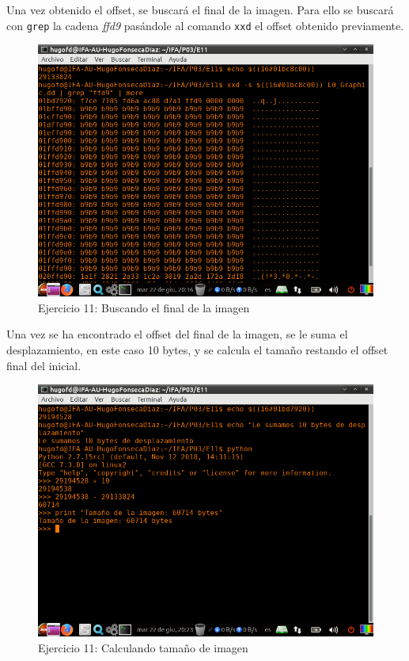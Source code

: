 \documentclass[11pt]{article}
\begin{document}
Una vez obtenido el offset, se buscará el final de la imagen. Para ello se buscará con \verb|grep| la cadena \textit{ffd9} pasándole al comando \verb|xxd| el offset obtenido previamente.

\begin{figure}[H]
    \caption{Ejercicio 11: Buscando el final de la imagen}
    \centering
    \includegraphics[scale=0.7]{e11-2.png}
\end{figure}

Una vez se ha encontrado el offset del final de la imagen, se le suma el desplazamiento, en este caso 10 bytes, y se calcula el tamaño restando el offset final del inicial.

\begin{figure}[H]
    \caption{Ejercicio 11: Calculando tamaño de imagen}
    \centering
    \includegraphics[scale=0.7]{e11-3.png}
\end{figure}
\end{document}
